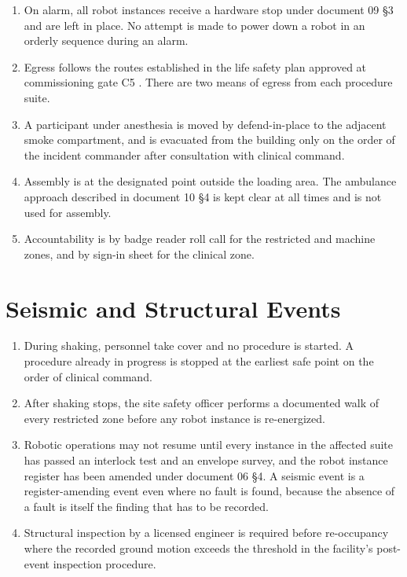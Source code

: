 \begin{enumerate}
\item On alarm, all robot instances receive a hardware stop under document 09 §3
  and are left in place. No attempt is made to power down a robot in an orderly
  sequence during an alarm.

\item Egress follows the routes established in the life safety plan approved at
  commissioning gate C5 \cite{nfpa101}. There are two means of egress from each
  procedure suite.

\item A participant under anesthesia is moved by defend-in-place to the adjacent
  smoke compartment, and is evacuated from the building only on the order of the
  incident commander after consultation with clinical command.

\item Assembly is at the designated point outside the loading area. The
  ambulance approach described in document 10 §4 is kept clear at all times and
  is not used for assembly.

\item Accountability is by badge reader roll call for the restricted and machine
  zones, and by sign-in sheet for the clinical zone.
\end{enumerate}

\section{Seismic and Structural Events}

\begin{enumerate}
\item During shaking, personnel take cover and no procedure is started. A
  procedure already in progress is stopped at the earliest safe point on the
  order of clinical command.

\item After shaking stops, the site safety officer performs a documented walk of
  every restricted zone before any robot instance is re-energized.

\item Robotic operations may not resume until every instance in the affected
  suite has passed an interlock test and an envelope survey, and the robot
  instance register has been amended under document 06 §4. A seismic event is a
  register-amending event even where no fault is found, because the absence of a
  fault is itself the finding that has to be recorded.

\item Structural inspection by a licensed engineer is required before
  re-occupancy where the recorded ground motion exceeds the threshold in the
  facility's post-event inspection procedure.
\end{enumerate}

